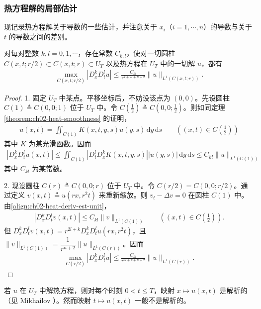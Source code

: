 \documentclass[../../main.tex]{subfiles}
\begin{document}
\subsubsection{热方程解的局部估计}

现记录热方程解关于导数的一些估计，并注意关于 $x_i$（$i=1,\cdots,n$）的导数与关于 $t$ 的导数之间的差别。

\begin{theorem}[导数估计]\label{theorem:ch02-heat-deriv-est}对每对整数 $k,l=0,1,\cdots$，存在常数 $C_{k,l}$，使对一切圆柱 $C(x,t;r/2)\subset C(x,t;r)\subset U_T$ 以及热方程在 $U_T$ 中的一切解 $u$，都有
\begin{align*}
\max_{C(x,t;r/2)}|D_x^k D_t^l u|\leqslant\frac{C_{kl}}{r^{k+2l+n+2}}\|u\|_{L^1(C(x,t;r))}.
\end{align*}
\end{theorem}

\begin{proof}
1. 固定 $U_T$ 中某点。平移坐标后，不妨设该点为 $(0,0)$。先设圆柱 $C(1)\triangleq C(0,0;1)$ 位于 $U_T$ 中。令 $C(\frac{1}{2})\triangleq C(0,0;\frac{1}{2})$。则如同定理\cref{theorem:ch02-heat-smoothness} 的证明，
\begin{align*}
u(x,t)=\iint_{C(1)}K(x,t,y,s)u(y,s)\,\mathrm{d}y\,\mathrm{d}s \qquad ((x,t)\in C(\tfrac{1}{2}))
\end{align*}
其中 $K$ 为某光滑函数。因而
\begin{align}\label{align:ch02-heat-deriv-est-unit}
|D_x^k D_t^l u(x,t)|\leqslant\iint_{C(1)}|D_t^l D_x^k K(x,t,y,s)||u(y,s)|\,\mathrm{d}y\,\mathrm{d}s\leqslant C_{kl}\|u\|_{L^1(C(1))}
\end{align}
其中 $C_{kl}$ 为某常数。

2. 现设圆柱 $C(r)\triangleq C(0,0;r)$ 位于 $U_T$ 中。令 $C(r/2)=C(0,0;r/2)$。通过定义 $v(x,t)\triangleq u(rx,r^2t)$ 来重新缩放。则 $v_t-\Delta v=0$ 在圆柱 $C(1)$ 中。由\eqref{align:ch02-heat-deriv-est-unit}，
\begin{align*}
|D_x^k D_t^l v(x,t)|\leqslant C_{kl}\|v\|_{L^1(C(1))} \qquad ((x,t)\in C(\tfrac{1}{2})).
\end{align*}
但 $D_x^k D_t^l v(x,t)=r^{2l+k}D_x^k D_t^l u(rx,r^2t)$，且 $\|v\|_{L^1(C(1))}=\dfrac{1}{r^{n+2}}\|u\|_{L^1(C(r))}$。因而
\begin{align*}
\max_{C(r/2)}|D_x^k D_t^l u|\leqslant\frac{C_{kl}}{r^{2l+k+n+2}}\|u\|_{L^1(C(r))}.
\end{align*}
\end{proof}

若 $u$ 在 $U_T$ 中解热方程，则对每个时刻 $0<t\leqslant T$，映射 $x\mapsto u(x,t)$ 是解析的（见 Mikhailov \cite{M}）。然而映射 $t\mapsto u(x,t)$ 一般不是解析的。
\end{document}
